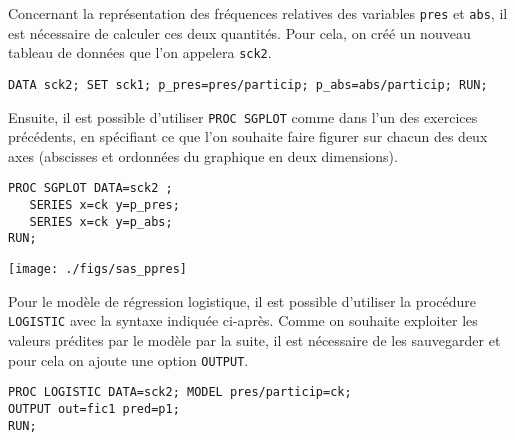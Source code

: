 Concernant la représentation des fréquences relatives des variables
\texttt{pres} et \texttt{abs}, il est nécessaire de calculer ces deux
quantités.  Pour cela, on créé un nouveau tableau de données que l'on
appelera \texttt{sck2}.
\begin{verbatim}
DATA sck2; SET sck1; p_pres=pres/particip; p_abs=abs/particip; RUN;
\end{verbatim}
Ensuite, il est possible d'utiliser \texttt{PROC SGPLOT} comme dans l'un des
exercices précédents, en spécifiant ce que l'on souhaite faire figurer sur
chacun des deux axes (abscisses et ordonnées du graphique en deux
dimensions).
\begin{verbatim}
PROC SGPLOT DATA=sck2 ;
   SERIES x=ck y=p_pres;
   SERIES x=ck y=p_abs;
RUN;
\end{verbatim}

\texttt{[image: ./figs/sas\_ppres]}

Pour le modèle de régression logistique, il est possible d'utiliser la
procédure \texttt{LOGISTIC} avec la syntaxe indiquée ci-après. Comme on
souhaite exploiter les valeurs prédites par le modèle par la suite, il est
nécessaire de les sauvegarder et pour cela on ajoute une option
\texttt{OUTPUT}.
\begin{verbatim}
PROC LOGISTIC DATA=sck2; MODEL pres/particip=ck;
OUTPUT out=fic1 pred=p1;
RUN;
\end{verbatim}

